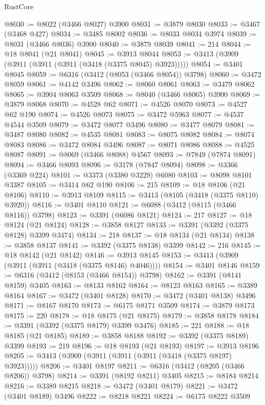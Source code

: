 \begin{lexlean}{RustCore}
\begin{coremodule}
@8030 := @8022 (@3466 @8027) @3900
@8031 := @3879 @8030
@8033 := @3467 (@3468 @427)
@8034 := @3485 @8002
@8036 := @8033 @8034 @3974
@8039 := @8031 (@3466 @8036) @3900
@8040 := @3879 @8039
@8041 := 214
@8044 := @18 @8041 (@21 @8041)
@8045 := @3913 @8044
@8053 := @3413 (@3909 (@3911 (@3911 (@3911 (@3418 (@3375 @8045) @3923)))))
@8054 := @3401 @8045
@8059 := @6316 (@3412 (@8053 (@3466 @8054)) @3798)
@8060 := @3472 @8059
@8061 := @4142 @3496
@8062 := @8060 @8061
@8063 := @3479 @8062
@8065 := @3904 @8063 @3509
@8068 := @8040 (@3466 @8065) @3900
@8069 := @3879 @8068
@8070 := @4528 @62
@8071 := @4526 @8070
@8073 := @4527 @62 @190
@8074 := @4526 @8073
@8075 := @3472 @5963
@8077 := @4537 @4544 @3509
@8079 := @3472 @8077 @3496
@8080 := @3477 @8079
@8081 := @3487 @8080
@8082 := @4535 @8081
@8083 := @8075 @8082
@8084 := @8074 @8083
@8086 := @3472 @8084 @3496
@8087 := @8071 @8086
@8088 := @4525 @8087
@8091 := @8069 (@3466 @8088) @4567
@8093 := @7849 (@7874 @8091)
@8094 := @3466 @8093
@8096 := @3178 (@7847 @8094)
@8098 := @3366 (@3369 @224)
@8101 := @3373 (@3380 @3229) @6080
@8103 := @8098 @8101 @3387
@8105 := @3414 @62 @190
@8106 := 215
@8109 := @18 @8106 (@21 @8106)
@8110 := @3913 @8109
@8115 := @3413 (@8105 (@3418 (@3375 @8110) @3920))
@8116 := @3401 @8110
@8121 := @6088 (@3412 (@8115 (@3466 @8116)) @3798)
@8123 := @3391 (@6086 @8121)
@8124 := 217
@8127 := @18 @8124 (@21 @8124)
@8128 := @3858 @8127
@8133 := @3391 (@3392 (@3375 @8128) @3399 @3474)
@8134 := 218
@8137 := @18 @8134 (@21 @8134)
@8138 := @3858 @8137
@8141 := @3392 (@3375 @8138) @3399
@8142 := 216
@8145 := @18 @8142 (@21 @8142)
@8146 := @3913 @8145
@8153 := @3413 (@3909 (@3911 (@3911 (@3418 (@3375 @8146) @4046))))
@8154 := @3401 @8146
@8159 := @6316 (@3412 (@8153 (@3466 @8154)) @3798)
@8162 := @3391 (@8141 @8159) @3405
@8163 := @8133 @8162
@8164 := @8123 @8163
@8165 := @3389 @8164
@8167 := @3472 (@3401 @8128)
@8170 := @3472 (@3401 @8138) @3496
@8171 := @8167 @8170
@8173 := @6175 @8171 @3509
@8174 := @3879 @8173
@8175 := 220
@8178 := @18 @8175 (@21 @8175)
@8179 := @3858 @8178
@8184 := @3391 (@3392 (@3375 @8179) @3399 @3476)
@8185 := 221
@8188 := @18 @8185 (@21 @8185)
@8189 := @3858 @8188
@8192 := @3392 (@3375 @8189) @3399
@8193 := 219
@8196 := @18 @8193 (@21 @8193)
@8197 := @3913 @8196
@8205 := @3413 (@3909 (@3911 (@3911 (@3911 (@3418 (@3375 @8197) @3923)))))
@8206 := @3401 @8197
@8211 := @6316 (@3412 (@8205 (@3466 @8206)) @3798)
@8214 := @3391 (@8192 @8211) @3405
@8215 := @8184 @8214
@8216 := @3389 @8215
@8218 := @3472 (@3401 @8179)
@8221 := @3472 (@3401 @8189) @3496
@8222 := @8218 @8221
@8224 := @6175 @8222 @3509

\end{coremodule}
\end{lexlean}
